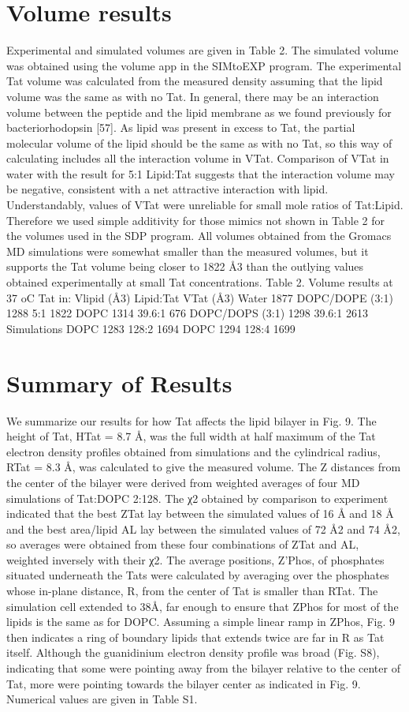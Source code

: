 \section{Volume results}
Experimental and simulated volumes are given in Table 2. The simulated volume was
obtained using the volume app in the SIMtoEXP program. The experimental Tat volume was
calculated from the measured density assuming that the lipid volume was the same as with no
Tat. In general, there may be an interaction volume between the peptide and the lipid membrane
as we found previously for bacteriorhodopsin [57]. As lipid was present in excess to Tat, the
partial molecular volume of the lipid should be the same as with no Tat, so this way of
calculating includes all the interaction volume in VTat. Comparison of VTat in water with the
result for 5:1 Lipid:Tat suggests that the interaction volume may be negative, consistent with a
net attractive interaction with lipid. Understandably, values of VTat were unreliable for small
mole ratios of Tat:Lipid. Therefore we used simple additivity for those mimics not shown in
Table 2 for the volumes used in the SDP program. All volumes obtained from the Gromacs MD
simulations were somewhat smaller than the measured volumes, but it supports the Tat volume
being closer to 1822 Å3 than the outlying values obtained experimentally at small Tat
concentrations.
Table 2. Volume results at 37 oC
Tat in: Vlipid (Å3) Lipid:Tat VTat (Å3)
Water 1877
DOPC/DOPE (3:1) 1288 5:1 1822
DOPC 1314 39.6:1 676
DOPC/DOPS (3:1) 1298 39.6:1 2613
Simulations
DOPC 1283 128:2 1694
DOPC 1294 128:4 1699

\section{Summary of Results}
We summarize our results for how Tat affects the lipid bilayer in Fig. 9. The height of
Tat, HTat = 8.7 Å, was the full width at half maximum of the Tat electron density profiles
obtained from simulations and the cylindrical radius, RTat = 8.3 Å, was calculated to give the
measured volume. The Z distances from the center of the bilayer were derived from weighted
averages of four MD simulations of Tat:DOPC 2:128. The χ2 obtained by comparison to
experiment indicated that the best ZTat lay between the simulated values of 16 Å and 18 Å and
the best area/lipid AL lay between the simulated values of 72 Å2 and 74 Å2, so averages were
obtained from these four combinations of ZTat and AL, weighted inversely with their χ2. The
average positions, Z'Phos, of phosphates situated underneath the Tats were calculated by
averaging over the phosphates whose in-plane distance, R, from the center of Tat is smaller than
RTat. The simulation cell extended to 38Å, far enough to ensure that ZPhos for most of the lipids is
the same as for DOPC. Assuming a simple linear ramp in ZPhos, Fig. 9 then indicates a ring of
boundary lipids that extends twice are far in R as Tat itself. Although the guanidinium electron
density profile was broad (Fig. S8), indicating that some were pointing away from the bilayer
relative to the center of Tat, more were pointing towards the bilayer center as indicated in Fig. 9.
Numerical values are given in Table S1.